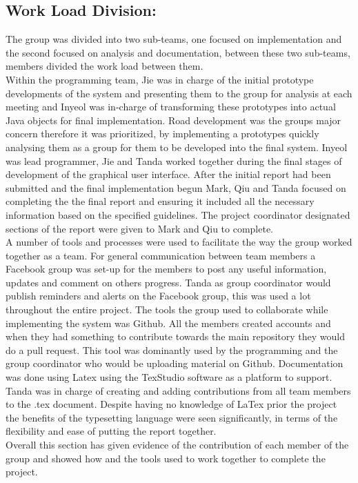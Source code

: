 \documentclass[11pt]{article}
\begin{document}
\subsection{Work Load Division:}
The group was divided into two sub-teams, one focused on implementation and the second focused on analysis and documentation, between these two sub-teams, members divided the work load between them.\\ 
Within the programming team, Jie was in charge of the initial prototype developments of the system and presenting them to the group for analysis at each meeting and Inyeol was in-charge of transforming these prototypes into actual Java objects for final implementation. Road development was the groups major concern therefore it was prioritized, by implementing a prototypes quickly analysing them as a group for them to be developed into the final system. Inyeol was lead programmer, Jie and Tanda worked together during the final stages of development of the graphical user interface.
After the initial report had been submitted and the final implementation begun Mark, Qiu and Tanda focused on completing the the final report and ensuring it included all the necessary information based on the specified guidelines. The project coordinator designated sections of the report were given to Mark and Qiu to complete. \\
A number of tools and processes were used to facilitate the way the group worked together as a team. For general communication between team members a Facebook group was set-up for the members to post any useful information, updates and comment on others progress. Tanda as group coordinator would publish reminders and alerts on the Facebook group, this was used a lot throughout the entire project. The tools the group used to collaborate while implementing the system was Github. All the members created accounts and when they had something to contribute towards the main repository they would do a pull request. This tool was dominantly used by the programming and the group coordinator who would be uploading material on Github. 
Documentation was done using Latex using the TexStudio software as a platform to support. Tanda was in charge of creating and adding contributions from all team members to the .tex document. Despite having no knowledge of LaTex prior the project the benefits of the typesetting language were seen significantly, in terms of the flexibility and ease of putting the report together.
\\
Overall this section has given evidence of the contribution of each member of the group and showed how and the tools used to work together to complete the project. 
	
\end{document}
